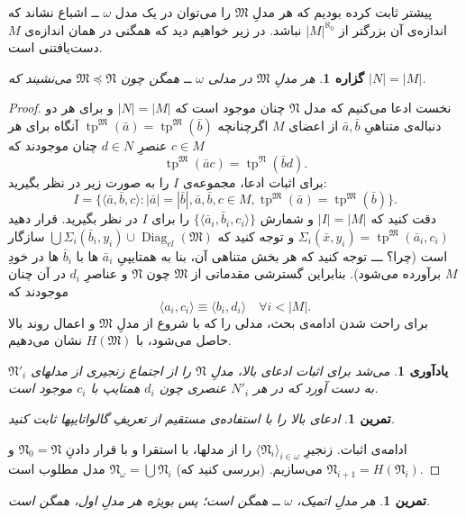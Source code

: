 \documentclass[12pt,a4paper]{article}
\theoremstyle{colorhead}
\newtheorem{tam}[thm]{تمرین}
\newtheorem{prop}[thm]{گزاره}
\newtheorem{yad}[thm]{یادآوری}
\DeclareMathOperator{\diag}{Diag}
\DeclareMathOperator{\tp}{tp}
\begin{document}
پیشتر ثابت کرده‌ بودیم که هر مدلِ
$\mathfrak{M}$
را می‌توان در یک مدل 
$\omega$ 
ــ
اشباع نشاند که اندازه‌ی آن بزرگتر از
$|M|^{\aleph_0}$
نباشد. در زیر خواهیم دید که همگنی در همان اندازه‌ی
$M$
دست‌یافتنی است.
\begin{prop}
هر مدلِ
$\mathfrak{M}$
در مدلی 
$\omega$
ــ
همگن چون
$\mathfrak{M}\preceq \mathfrak{N}$
می‌نشیند که
$|N|=|M|$.
\end{prop}
\begin{proof}
نخست ادعا می‌کنیم که
مدل
$\mathfrak{N}$
چنان موجود است که
$|N|=|M|$
و برای هر دو دنباله‌ی متناهیِ
$\bar{a},\bar{b}$
از اعضای 
$M$
اگرچنانچه
$\tp^\mathfrak{M}(\bar{a})=\tp^\mathfrak{M}(\bar{b})$
آنگاه برای هر
$c\in M$
عنصرِ
$d\in N$
چنان موجودند که
\[
\tp^\mathfrak{M}(\bar{a}c)=\tp^\mathfrak{N}(\bar{b}d).
\]
برای اثبات ادعا‌، مجموعه‌ی
$I$
را به صورت زیر در نظر بگیرید:
\[
I=\{\langle \bar{a},\bar{b},c\rangle: |\bar{a}|=|\bar{b}|, \bar{a},\bar{b},c\in M,\tp^\mathfrak{M}(\bar{a})=\tp^\mathfrak{M}(\bar{b})\}.
\]
دقت کنید
که
$|I|=|M|$
و شمارش 
$\{\langle\bar{a}_i,\bar{b}_i,c_i\rangle\}$
را برای 
$I$
در نظر بگیرید. قرار دهید
$\Sigma_i(\bar{x},y_i)=\tp^\mathfrak{M}(\bar{a}_i,c_i)$
و توجه کنید که
$\bigcup \Sigma_i(\bar{b}_i,y_i)\cup \diag_{el}(\mathfrak{M})$
سازگار است (چرا؟ ـــ توجه کنید که هر بخش متناهی آن، بنا به 
همتایپیِ
$\bar{a}_i$
ها با
$\bar{b}_i$
ها در خودِ
$M$
برآورده می‌شود). بنابراین
گسترشی مقدماتی از
$\mathfrak{M}$
چون
$\mathfrak{N}$
و عناصرِ
$d_i$
در آن چنان موجودند که 
\[
\langle a_i,c_i\rangle \equiv \langle b_i,d_i\rangle \quad \forall i<|M|.
\]
برای راحت شدن ادامه‌ی بحث،‌
مدلی 
 را که با شروع از مدلِ
$\mathfrak{M}$
و اعمال روند بالا حاصل می‌شود، با 
$H(\mathfrak{M})$
نشان می‌دهیم.
\begin{yad}
می‌شد برای اثبات ادعای بالا، مدلِ
$\mathfrak{N}$
را از اجتماع زنجیری از مدلهای
$\mathfrak{N}'_i$
به دست آورد که در
هر
$N'_i$
عنصری چون
$d_i$
همتایپ با
$c_i$
موجود است.  
\end{yad}
\begin{tam}
ادعای بالا را با استفاده‌ی مستقیم از تعریفِ گالواتایپها
ثابت کنید.
\end{tam}
ادامه‌ی اثبات. زنجیرِ
$\langle \mathfrak{N}_i\rangle_{i\in \omega}$
را از مدلها، با استقرا و با قرار دادنِ
\mbox{$\mathfrak{N}_0=\mathfrak{N}$}
و 
\mbox{$\mathfrak{N}_{i+1}=H(\mathfrak{N}_i)$}
می‌سازیم. (بررسی کنید که)
\mbox{$\mathfrak{N}_\omega=\bigcup \mathfrak{N}_i$}
مدل مطلوب است.
\end{proof}
\begin{tam}
هر مدلِ
اتمیک،
$\omega$
ــ
همگن است؛ پس بویژه هر مدلِ اول، همگن است.
\end{tam}
\end{document}
